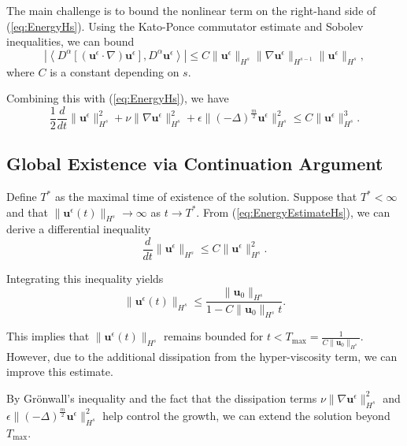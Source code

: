 \documentclass[11pt]{article}
\begin{document}
The main challenge is to bound the nonlinear term on the right-hand side of (\ref{eq:EnergyHs}). Using the Kato-Ponce commutator estimate and Sobolev inequalities, we can bound
\begin{equation}
\left| \left\langle D^\alpha [(\mathbf{u}^\epsilon \cdot \nabla) \mathbf{u}^\epsilon], D^\alpha \mathbf{u}^\epsilon \right\rangle \right| \leq C \| \mathbf{u}^\epsilon \|_{H^s} \| \nabla \mathbf{u}^\epsilon \|_{H^{s-1}} \| \mathbf{u}^\epsilon \|_{H^s},
\end{equation}
where $C$ is a constant depending on $s$.

Combining this with (\ref{eq:EnergyHs}), we have
\begin{equation}
\frac{1}{2} \frac{d}{dt} \| \mathbf{u}^\epsilon \|_{H^s}^2 + \nu \| \nabla \mathbf{u}^\epsilon \|_{H^s}^2 + \epsilon \| (-\Delta)^{\frac{m}{2}} \mathbf{u}^\epsilon \|_{H^s}^2 \leq C \| \mathbf{u}^\epsilon \|_{H^s}^3.
\label{eq:EnergyEstimateHs}
\end{equation}

\subsection{Global Existence via Continuation Argument}

Define $T^*$ as the maximal time of existence of the solution. Suppose that $T^* < \infty$ and that $\| \mathbf{u}^\epsilon(t) \|_{H^s} \to \infty$ as $t \to T^*$. From (\ref{eq:EnergyEstimateHs}), we can derive a differential inequality
\begin{equation}
\frac{d}{dt} \| \mathbf{u}^\epsilon \|_{H^s} \leq C \| \mathbf{u}^\epsilon \|_{H^s}^2.
\end{equation}

Integrating this inequality yields
\begin{equation}
\| \mathbf{u}^\epsilon(t) \|_{H^s} \leq \frac{\| \mathbf{u}_0 \|_{H^s}}{1 - C \| \mathbf{u}_0 \|_{H^s} t}.
\end{equation}

This implies that $\| \mathbf{u}^\epsilon(t) \|_{H^s}$ remains bounded for $t < T_{\text{max}} = \frac{1}{C \| \mathbf{u}_0 \|_{H^s}}$. However, due to the additional dissipation from the hyper-viscosity term, we can improve this estimate.

By Grönwall's inequality and the fact that the dissipation terms $\nu \| \nabla \mathbf{u}^\epsilon \|_{H^s}^2$ and $\epsilon \| (-\Delta)^{\frac{m}{2}} \mathbf{u}^\epsilon \|_{H^s}^2$ help control the growth, we can extend the solution beyond $T_{\text{max}}$.
\end{document}
